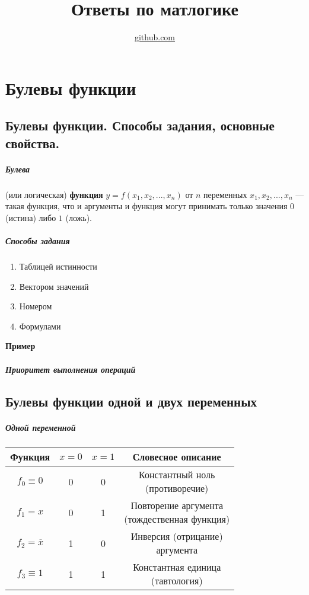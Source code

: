 \documentclass[14pt, a4paper]{extarticle}
\begin{document}
\title{Ответы по матлогике}
\author{\url{github.com}}
\maketitle

\newcommand{\itembf}[1]{\item \textbf{#1}}
\newtheorem*{defin}{Определение}[subsection]
\newtheorem*{theorem}{Теорема}[subsection]

\newpage
\tableofcontents
\newpage

\section{Булевы функции}
\subsection{Булевы функции. Способы задания, основные свойства.}

\subparagraph{Булева} (или логическая) \textbf{функция} $y=f(x_1, x_2, ..., x_n)$ от $n$  переменных $x_1, x_2, ..., x_n$ --- такая функция, что и аргументы и функция могут принимать только значения $0$ (истина) либо $1$ (ложь).

\subparagraph{Способы задания}
\begin{enumerate}
  \item {Таблицей истинности}
  \item {Вектором значений}
  \item {Номером}
  \item {Формулами}
\end{enumerate}

{\small
  \textbf{Пример}
}
\subparagraph{Приоритет выполнения операций}

\subsection{Булевы функции одной и двух переменных}

\subparagraph{Одной переменной}


\begin{center}
\begin{tabular}{|c|c|c|c|}
  \hline
  Функция & $x=0$ & $x=1$ & Словесное описание \\
  \hline
  $f_0 \equiv 0$ & 0 & 0 & \makecell{Константный ноль\\(противоречие)} \\
  \hline
  $f_1 = x$ & 0 & 1 & \makecell{Повторение аргумента \\ (тождественная функция)} \\
  \hline
  $f_2 = \overline x$ & 1 & 0 & \makecell{Инверсия (отрицание)\\ аргумента} \\
  \hline
  $f_3 \equiv 1$ & 1 & 1 & \makecell{Константная единица\\(тавтология)} \\
  \hline
\end{tabular}
\end{center}
\end{document}
